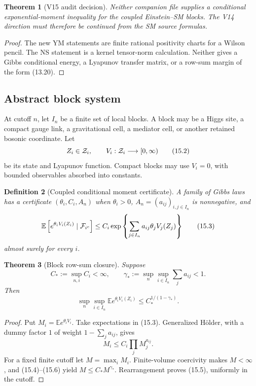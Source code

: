 \documentclass[11pt]{article}
\newtheorem{theorem}{Theorem}[section]
\newtheorem{definition}[theorem]{Definition}
\theoremstyle{remark}
\begin{document}
\begin{theorem}[V15 audit decision]
\label{thm:v17v15-audit}
Neither companion file supplies a conditional exponential-moment
inequality for the coupled Einstein--SM blocks.  The V14 direction
must therefore be continued from the SM source formulas.
\end{theorem}

\begin{proof}
The new YM statements are finite rational positivity charts for a
Wilson pencil.  The NS statement is a kernel tensor-norm
calculation.  Neither gives a Gibbs conditional energy, a
Lyapunov transfer matrix, or a row-sum margin of the form (13.20).
\end{proof}

\subsection{Abstract block system}

At cutoff \(n\), let \(I_n\) be a finite set of local blocks.  A
block may be a Higgs site, a compact gauge link, a gravitational
cell, a mediator cell, or another retained bosonic coordinate.  Let
\[
 Z_i\in{\cal Z}_i,\qquad
 V_i:{\cal Z}_i\longrightarrow[0,\infty)            \tag{15.2}
\]
be its state and Lyapunov function.  Compact blocks may use
\(V_i=0\), with bounded observables absorbed into constants.

\begin{definition}[Coupled conditional moment certificate]
\label{def:v17v15-certificate}
A family of Gibbs laws has a certificate
\((\theta_i,C_i,A_n)\) when \(\theta_i>0\),
\(A_n=(a_{ij})_{i,j\in I_n}\) is nonnegative, and
\[
 \mathbb E\left[
 e^{\theta_iV_i(Z_i)}\mid{\cal F}_{i^c}\right]
 \leq
 C_i\exp\left\{
 \sum_{j\in I_n}a_{ij}\theta_jV_j(Z_j)\right\}       \tag{15.3}
\]
almost surely for every \(i\).
\end{definition}

\begin{theorem}[Block row-sum closure]
\label{thm:v17v15-row}
Suppose
\[
 C_*:=\sup_{n,i}C_i<\infty,\qquad
 \gamma_*:=\sup_n\sup_{i\in I_n}\sum_ja_{ij}<1.     \tag{15.4}
\]
Then
\[
 \sup_n\sup_{i\in I_n}
 \mathbb E e^{\theta_iV_i(Z_i)}
 \leq C_*^{1/(1-\gamma_*)}.                         \tag{15.5}
\]
\end{theorem}

\begin{proof}
Put \(M_i=\mathbb E e^{\theta_iV_i}\).  Take expectations in
(15.3).  Generalized H\"older, with a dummy factor \(1\) of weight
\(1-\sum_ja_{ij}\), gives
\[
 M_i\leq C_i\prod_jM_j^{a_{ij}}.                   \tag{15.6}
\]
For a fixed finite cutoff let \(M=\max_iM_i\).  Finite-volume
coercivity makes \(M<\infty\), and (15.4)--(15.6) yield
\(M\leq C_*M^{\gamma_*}\).  Rearrangement proves (15.5), uniformly
in the cutoff.
\end{proof}
\end{document}
